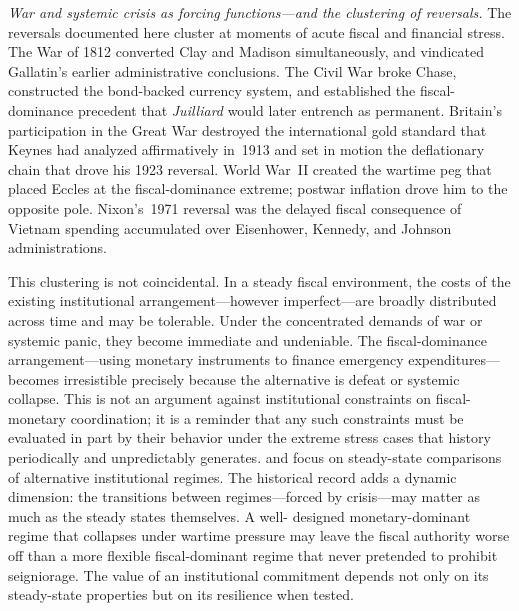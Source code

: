 \documentclass[12pt]{article}
\begin{document}
\textit{War and systemic crisis as forcing functions---and the clustering
of reversals.}  The reversals documented here cluster at moments of acute
fiscal and financial stress.  The War of 1812 converted Clay and Madison
simultaneously, and vindicated Gallatin's earlier administrative
conclusions.  The Civil War broke Chase, constructed the bond-backed
currency system, and established the fiscal-dominance precedent that
\textit{Juilliard} would later entrench as permanent.  Britain's
participation in the Great War destroyed the international gold standard
that Keynes had analyzed affirmatively in~1913 and set in motion the
deflationary chain that drove his 1923 reversal.  World War~II created
the wartime peg that placed Eccles at the fiscal-dominance extreme;
postwar inflation drove him to the opposite pole.  Nixon's~1971 reversal
was the delayed fiscal consequence of Vietnam spending accumulated over
Eisenhower, Kennedy, and Johnson administrations.

This clustering is not coincidental.  In a steady fiscal environment,
the costs of the existing institutional arrangement---however
imperfect---are broadly distributed across time and may be tolerable.
Under the concentrated demands of war or systemic panic, they become
immediate and undeniable.  The fiscal-dominance arrangement---using
monetary instruments to finance emergency expenditures---becomes
irresistible precisely because the alternative is defeat or systemic
collapse.  This is not an argument against institutional constraints on
fiscal-monetary coordination; it is a reminder that any such constraints
must be evaluated in part by their behavior under the extreme stress
cases that history periodically and unpredictably generates.
\citet{SargentWallace1981} and \citet{Sargent2011} focus on steady-state
comparisons of alternative institutional regimes.  The historical record
adds a dynamic dimension: the transitions between regimes---forced by
crisis---may matter as much as the steady states themselves.  A well-
designed monetary-dominant regime that collapses under wartime pressure
may leave the fiscal authority worse off than a more flexible
fiscal-dominant regime that never pretended to prohibit seigniorage.
The value of an institutional commitment depends not only on its
steady-state properties but on its resilience when tested.
\end{document}
